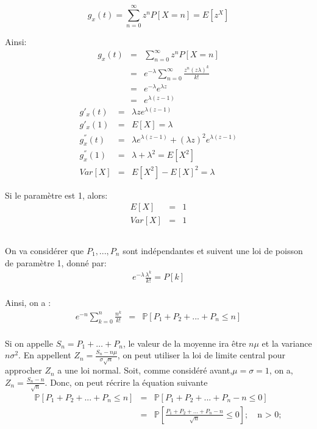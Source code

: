 \documentclass[a4paper]{article}
\begin{document}
\begin{equation}
  g_x(t)=\sum_{n=0}^{\infty}z^nP[X=n]=E[z^X]
\end{equation}

Ainsi:
\begin{eqnarray*}
  g_x(t)&=& \sum_{n=0}^{\infty}z^nP[X=n]\\
  &=& e^{-\lambda}\sum_{n=0}^{\infty}\frac{z^n(z\lambda)^k}{k!}\\
  &=& e^{-\lambda}e^{\lambda z}\\
  &=& e^{\lambda(z-1)}
\end{eqnarray*}
\begin{eqnarray*}
  g'_x(t)&=& \lambda ze^{\lambda(z-1)}\\
  g'_x(1)&=&E[X]= \lambda\\
  g^{''}_x(t)&=& \lambda e^{\lambda(z-1)}+(\lambda z)^2e^{\lambda(z-1)}\\
  g^{''}_x(1)&=& \lambda + \lambda^2 = E[X^2]\\
  Var[X] &=& E[X^2]-E[X]^2 = \lambda
\end{eqnarray*}

Si le paramètre est 1, alors:
\begin{eqnarray*}
  E[X]&=& 1\\
  Var[X] &=& 1
\end{eqnarray*}

\subsection{}

On va considérer que $P_1,...,P_n$ sont indépendantes et suivent une loi de poisson de paramètre 1, donné par:
\begin{eqnarray*}
  e^{-\lambda}\frac{\lambda^k}{k!}=P[k]\\
\end{eqnarray*}

Ainsi, on a :
\begin{eqnarray*}
  e^{-n}\sum_{k=0}^n\frac{n^k}{k!}&=&\mathbb{P}[P_1+P_2+...+P_n\leq n]\\
\end{eqnarray*}

Si on appelle $S_n=P_1+\dots+P_n$, le valeur de la moyenne ira être $n\mu$ et la
variance  $n\sigma^2$. En  appellent $Z_n=\frac{S_n-n\mu}{\sigma  \sqrt{n}}$, on
peut  utiliser  la  loi  de  limite  central pour  approcher  $Z_n$  a  une  loi
normal.      Soit,       comme      considéré      avant,$\mu=\sigma=1$,      on
a,$Z_n=\frac{S_n-n}{\sqrt{n}}$. Donc, on peut récrire la équation suivante
\begin{eqnarray*}
 \mathbb{P}[P_1+P_2+...+P_n\leq n]&=& \mathbb{P}[P_1+P_2+...+P_n-n \leq 0] \\
 &=& \mathbb{P}[\frac{P_1+P_2+...+P_n-n}{\sqrt{n}} \leq 0]  ; \quad \text{n > 0};
\end{eqnarray*}
\end{document}
